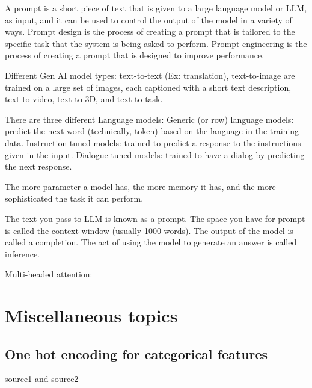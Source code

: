 \documentclass[12pt]{report}
\begin{document}
A prompt is a short piece of text that is given to a large language model or LLM, as input, and it can be used to control the output of the model in a variety of ways. Prompt design is the process of creating a prompt that is tailored to the specific task that the system is being asked to perform. Prompt engineering is the process of creating a prompt that is designed to improve performance.


Different Gen AI model types: text-to-text (Ex: translation), text-to-image are trained on a large set of images, each captioned with a short text description, text-to-video, text-to-3D, and text-to-task.


There are three different Language models: Generic (or row) language models: predict the next word (technically, token) based on the language in the training data. Instruction tuned models: trained to predict a response to the instructions given in the input. Dialogue tuned models: trained to have a dialog by predicting the next response.


The more parameter a model has, the more memory it has, and the more sophisticated the task it can perform.

The text you pass to LLM is known as a prompt. The space you have for prompt is called the context window (usually 1000 words). The output of the model is called a completion. The act of using the model to generate an answer is called inference.

Multi-headed attention:


\chapter[Miscellaneous topics]{Miscellaneous topics}

\section{One hot encoding for categorical features}
\label{sec:one-hot}

\href{https://www.youtube.com/watch?v=v_4KWmkwmsU&ab_channel=deeplizard}{source1} and \href{https://machinelearningmastery.com/how-to-one-hot-encode-sequence-data-in-python/}{source2}
\end{document}
